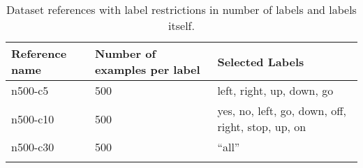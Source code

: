 \begin{table}[ht!]
\begin{center}
\caption{Dataset references with label restrictions in number of labels and labels itself.}
\begin{tabular}{ M{2cm}  M{2cm}  M{5cm} }
\toprule
\textbf{Reference name} & \textbf{Number of examples per label} & \textbf{Selected Labels}\\
\midrule
n500-c5 & 500 & left, right, up, down, go\\
n500-c10 & 500 & yes, no, left, go, down, off, right, stop, up, on\\
n500-c30 & 500 & \enquote{all}\\
\bottomrule
\label{tab:dataset_refs}
\end{tabular}
\end{center}
\end{table}
\FloatBarrier
\noindent
